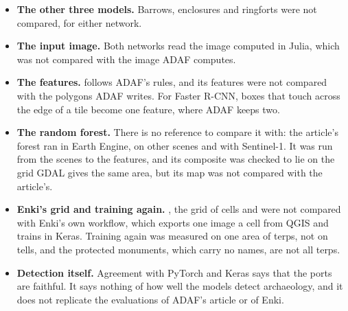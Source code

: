 \begin{itemize}
\item \textbf{The other three models.} Barrows, enclosures and ringforts were not compared, for either network.
\item \textbf{The input image.} Both networks read the image computed in Julia, which was not compared with the image
  ADAF computes.
\item \textbf{The features.}  follows ADAF's rules, and its features were not compared with the
  polygons ADAF writes. For Faster R-CNN, boxes that touch across the edge of a tile become one feature, where ADAF
  keeps two.
\item \textbf{The random forest.} There is no reference to compare it with: the article's forest ran in Earth Engine,
  on other scenes and with Sentinel-1. It was run from the scenes to the features, and its composite was checked to
  lie on the grid GDAL gives the same area, but its map was not compared with the article's.
\item \textbf{Enki's grid and training again.} , the grid of cells and  were
  not compared with Enki's own workflow, which exports one image a cell from QGIS and trains in Keras. Training again
  was measured on one area of terps, not on tells, and the protected monuments, which carry no names, are not all
  terps.
\item \textbf{Detection itself.} Agreement with PyTorch and Keras says that the ports are faithful. It says nothing of
  how well the models detect archaeology, and it does not replicate the evaluations of ADAF's article or of Enki.
\end{itemize}


